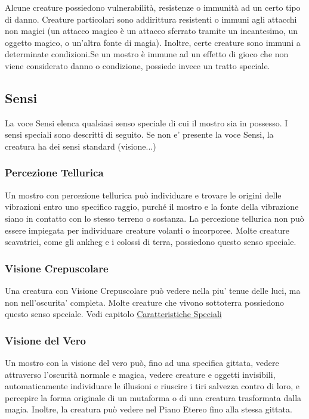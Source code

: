 \begin{multicols}{2}
Alcune creature possiedono vulnerabilità, resistenze o immunità ad un certo tipo di danno. Creature particolari sono addirittura resistenti o immuni agli attacchi non magici (un attacco magico è un attacco sferrato tramite un incantesimo, un oggetto magico, o un'altra fonte di magia). Inoltre, certe creature sono immuni a determinate condizioni.Se  un mostro è immune ad un effetto di gioco che non viene considerato danno o condizione, possiede invece un tratto speciale.

\subsection{Sensi}

La voce Sensi elenca qualsiasi senso speciale di cui il mostro sia in possesso. I sensi speciali sono descritti di seguito. Se non e' presente la voce Sensi, la creatura ha dei sensi standard (visione...)

\subsubsection{Percezione Tellurica}

Un mostro con percezione tellurica può individuare e trovare le origini delle vibrazioni entro uno specifico raggio, purché il mostro e la fonte della vibrazione siano in contatto con lo stesso terreno o sostanza. La percezione tellurica non può essere impiegata per individuare creature volanti o incorporee. Molte creature scavatrici, come gli ankheg e i colossi di terra, possiedono questo senso speciale.

\subsubsection{Visione Crepuscolare}

Una creatura con Visione Crepuscolare può vedere nella piu' tenue delle luci, ma non nell'oscurita' completa. Molte creature che vivono sottoterra possiedono questo senso
speciale.  Vedi capitolo \hyperref[sec:sec:visione-e-luce]{Caratteristiche Speciali}

\subsubsection{Visione del Vero}

Un mostro con la visione del vero può, fino ad una specifica gittata, vedere attraverso l'oscurità normale e magica, vedere creature e oggetti invisibili, automaticamente individuare le illusioni e riuscire i tiri salvezza contro di loro, e percepire la forma originale di un mutaforma o di una creatura trasformata dalla magia. Inoltre, la creatura può vedere nel Piano Etereo fino alla stessa gittata.


\end{multicols}
